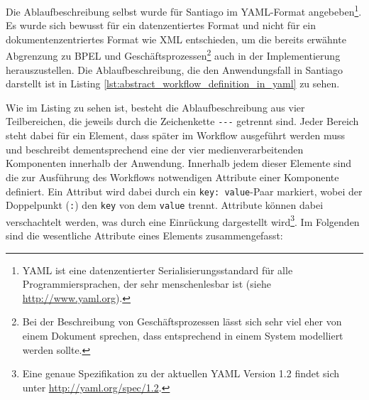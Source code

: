   Die Ablaufbeschreibung selbst wurde für Santiago im YAML-Format angebeben\footnote{YAML ist eine datenzentierter Serialisierungsstandard für alle Programmiersprachen, der sehr menschenlesbar ist (siehe \url{http://www.yaml.org}).}. Es wurde sich bewusst für ein datenzentiertes Format und nicht für ein dokumentenzentriertes Format wie XML entschieden, um die bereits erwähnte Abgrenzung zu BPEL und Geschäftsprozessen\footnote{Bei der Beschreibung von Geschäftsprozessen lässt sich sehr viel eher von einem Dokument sprechen, dass entsprechend in einem System modelliert werden sollte.} auch in der Implementierung herauszustellen. Die Ablaufbeschreibung, die den Anwendungsfall in Santiago darstellt ist in Listing \ref{lst:abstract_workflow_definition_in_yaml} zu sehen.



  Wie im Listing zu sehen ist, besteht die Ablaufbeschreibung aus vier Teilbereichen, die jeweils durch die Zeichenkette \verb!---! getrennt sind. Jeder Bereich steht dabei für ein Element, dass später im Workflow ausgeführt werden muss und beschreibt dementsprechend eine der vier medienverarbeitenden Komponenten innerhalb der Anwendung. Innerhalb jedem dieser Elemente sind die zur Ausführung des Workflows notwendigen Attribute einer Komponente definiert. Ein Attribut wird dabei durch ein \verb!key: value!-Paar markiert, wobei der Doppelpunkt (\verb!:!) den \verb!key! von dem \verb!value! trennt. Attribute können dabei verschachtelt werden, was durch eine Einrückung dargestellt wird\footnote{Eine genaue Spezifikation zu der aktuellen YAML Version 1.2 findet sich unter \url{http://yaml.org/spec/1.2}.}. Im Folgenden sind die wesentliche Attribute eines Elements zusammengefasst:
  
